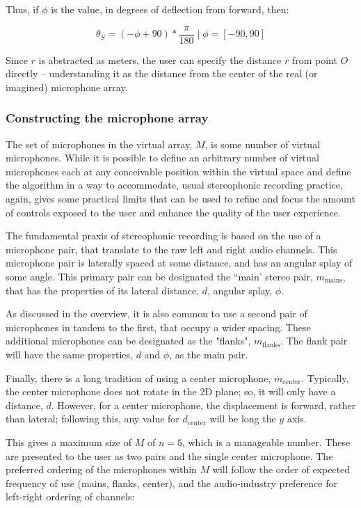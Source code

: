Thus, if $\phi$ is the value, in degrees of deflection from forward, then:

\begin{equation}
\theta_S = (-\phi + 90) * \frac{\pi}{180} \; | \; \phi = [-90,90]
\end{equation}

Since $r$ is abstracted as meters, the user can specify the distance $r$ from point $O$ directly -- understanding it as the distance from the center of the real (or imagined) microphone array.

\subsubsection{Constructing the microphone array}

The set of microphones in the virtual array, $M$, is some number of virtual microphones. While it is possible to define an arbitrary number of virtual microphones each at any conceivable position within the virtual space and define the algorithm in a way to accommodate, usual stereophonic recording practice, again, gives some practical limits that can be used to refine and focus the amount of controls exposed to the user and enhance the quality of the user experience.

The fundamental praxis of stereophonic recording is based on the use of a microphone pair, that translate to the raw left and right audio channels. This microphone pair is laterally spaced at some distance, and has an angular splay of some angle. This primary pair can be designated the ``main' stereo pair, $m_\text{mains}$, that has the properties of its lateral distance, $d$, angular splay, $\phi$.

As discussed in the overview, it is also common to use a second pair of microphones in tandem to the first, that occupy a wider spacing. These additional microphones can be designated as the "flanks", $m_\text{flanks}$. The flank pair will have the same properties, $d$ and $\phi$, as the main pair.

Finally, there is a long tradition of using a center microphone, $m_\text{center}$. Typically, the center microphone does not rotate in the 2D plane; so, it will only have a distance, $d$. However, for a center microphone, the displacement is forward, rather than lateral; following this, any value for $d_\text{center}$ will be long the $y$ axis.

This gives a maximum size of $M$ of $n=5$, which is a manageable number. These are presented to the user as two pairs and the single center microphone. The preferred ordering of the microphones within $M$ will follow the order of expected frequency of use (mains, flanks, center), and the audio-industry preference for left-right ordering of channels:

